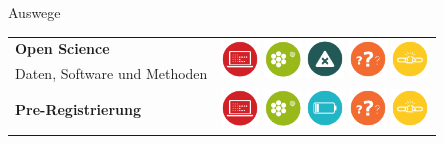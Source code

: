 \documentclass{beamer}
\begin{document}
\begin{frame}{Auswege}

    \begin{tabular}{>{\raggedright}p{5.5cm}l}
        \textbf{Open Science} & \multirow{2}{2cm}{%
            \includegraphics[width=1cm]{data_dredging}
            \includegraphics[width=1cm]{omitting_null_results}
            \includegraphics[width=1cm]{errors}
            \includegraphics[width=1cm]{underspecified_method}
            \includegraphics[width=1cm]{weak_experimental_design}} \\
        Daten, Software und Methoden & \\[1em]
        \textbf{Pre-Registrierung} & \multirow{2}{2cm}{%
            \includegraphics[width=1cm]{data_dredging}
            \includegraphics[width=1cm]{omitting_null_results}
            \includegraphics[width=1cm]{underpowered_study}
            \includegraphics[width=1cm]{underspecified_method}
            \includegraphics[width=1cm]{weak_experimental_design}} \\

\end{tabular}
\end{frame}
\end{document}

